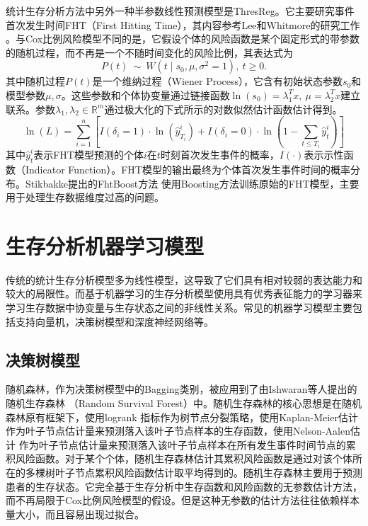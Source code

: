 统计生存分析方法中另外一种半参数线性预测模型是ThresReg。它主要研究事件首次发生时间FHT（First Hitting Time），其内容参考Lee和Whitmore的研究工作 。与Cox比例风险模型不同的是，它假设个体的风险函数是某个固定形式的带参数的随机过程，而不再是一个不随时间变化的风险比例，其表达式为
\begin{equation}
P(t)\ \sim \ W(t \mid s_0, \mu, \sigma^2=1),\ t\ge 0. \label{F7}
\end{equation}
其中随机过程$P(t)$是一个维纳过程（Wiener Process），它含有初始状态参数$s_0$和模型参数$\mu, \sigma$。这些参数和个体协变量通过链接函数$\ln⁡(s_0 )=\lambda_1^T x,\ \mu = \lambda_2^T x$建立联系。参数$\lambda_1,\lambda_2\in \mathbb{R}^m$通过极大化的下式所示的对数似然估计函数估计得到。
\begin{equation}
\ln(L)=\sum_{i=1}^{n} \left[ I(\delta_i=1)\cdot \ln(\hat{y}_{T_i}^i) + I(\delta_i=0) \cdot \ln(1-\sum_{t\le T_i}\hat{y}_t^i) \right] \label{F8}
\end{equation}
其中$\hat{y}_t^i$表示FHT模型预测的个体$i$在$t$时刻首次发生事件的概率，$I(\cdot)$表示示性函数（Indicator Function）。FHT模型的输出最终为个体首次发生事件时间的概率分布。Stikbakke提出的FhtBoost方法 使用Boosting方法训练原始的FHT模型，主要用于处理生存数据维度过高的问题。

\section{生存分析机器学习模型}

传统的统计生存分析模型多为线性模型，这导致了它们具有相对较弱的表达能力和较大的局限性。而基于机器学习的生存分析模型使用具有优秀表征能力的学习器来学习生存数据中协变量与生存状态之间的非线性关系。常见的机器学习模型主要包括支持向量机，决策树模型和深度神经网络等。

\subsection{决策树模型}

随机森林，作为决策树模型中的Bagging类别，被应用到了由Ishwaran等人提出的随机生存森林 （Random Survival Forest）中。随机生存森林的核心思想是在随机森林原有框架下，使用logrank 指标作为树节点分裂策略，使用Kaplan-Meier估计 作为叶子节点估计量来预测落入该叶子节点样本的生存函数，使用Nelson-Aalen估计 作为叶子节点估计量来预测落入该叶子节点样本在所有发生事件时间节点的累积风险函数。对于某个个体，随机生存森林估计其累积风险函数是通过对该个体所在的多棵树叶子节点累积风险函数估计取平均得到的。随机生存森林主要用于预测患者的生存状态。它完全基于生存分析中生存函数和风险函数的无参数估计方法，而不再局限于Cox比例风险模型的假设。但是这种无参数的估计方法往往依赖样本量大小，而且容易出现过拟合。

